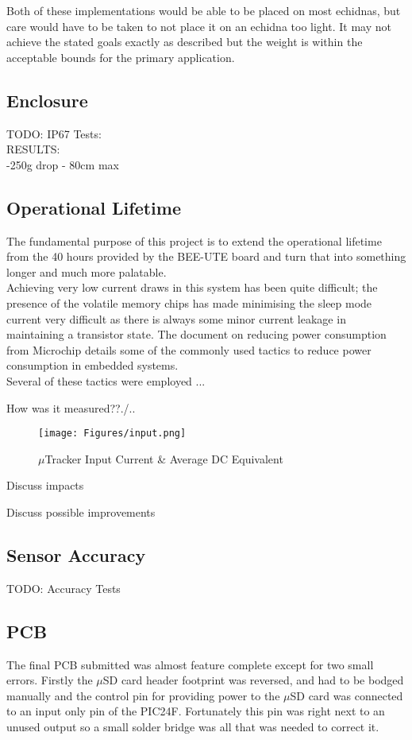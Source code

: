 \documentclass[12pt,openany,a4paper]{book}
\begin{document}
		Both of these implementations would be able to be placed on most echidnas, but care would have to be taken to not place it on an echidna too light. It may not achieve the stated goals exactly as described but the weight is within the acceptable bounds for the primary application.
		\subsection{Enclosure}
		TODO: IP67 Tests: \\
		RESULTS: \\
		-250g drop - 80cm max \\
		\subsection{Operational Lifetime}
		
		The fundamental purpose of this project is to extend the operational lifetime from the 40 hours provided by the BEE-UTE board \cite{Freakley13} and turn that into something longer and much more palatable. \\
		
		Achieving very low current draws in this system has been quite difficult; the presence of the volatile memory chips has made minimising the sleep mode current very difficult as there is always some minor current leakage in maintaining a transistor state. The document on reducing power consumption from Microchip \cite{PICPWR} details some of the commonly used tactics to reduce power consumption in embedded systems. \\
		
		Several of these tactics were employed ...
		
		How was it measured??./..
			\begin{figure}[H]
				\centering
				\texttt{[image: Figures/input.png]}
				\caption{$\mu$Tracker Input Current \& Average DC Equivalent}
				\label{fig:input}
			\end{figure}	
			
		Discuss impacts
		
		Discuss possible improvements
			
		\subsection{Sensor Accuracy}
		TODO: Accuracy Tests
		
		\subsection{PCB} \label{sec:PCBERROR}
		The final PCB submitted was almost feature complete except for two small errors. Firstly the $\mu$SD card header footprint was reversed, and had to be bodged manually and the control pin for providing power to the $\mu$SD card was connected to an input only pin of the PIC24F. Fortunately this pin was right next to an unused output so a small solder bridge was all that was needed to correct it. \\
		
\end{document}
